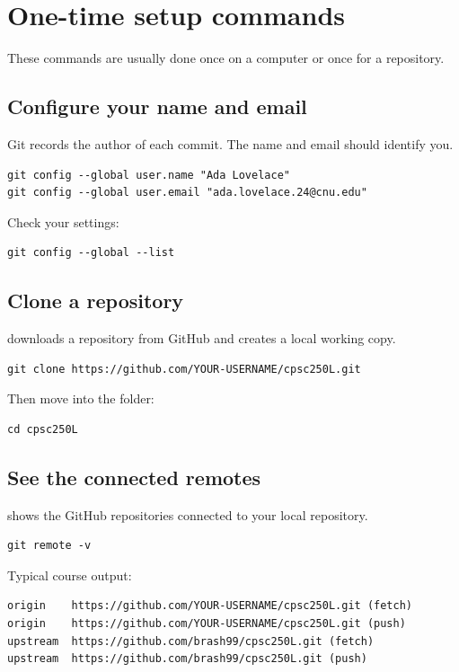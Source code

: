 \documentclass[11pt]{article}
\begin{document}
\section{One-time setup commands}

These commands are usually done once on a computer or once for a repository.

\subsection{Configure your name and email}
Git records the author of each commit.  The name and email should identify you.

\begin{lstlisting}[style=terminal]
git config --global user.name "Ada Lovelace"
git config --global user.email "ada.lovelace.24@cnu.edu"
\end{lstlisting}

Check your settings:

\begin{lstlisting}[style=terminal]
git config --global --list
\end{lstlisting}

\subsection{Clone a repository}
 downloads a repository from GitHub and creates a local working copy.

\begin{lstlisting}[style=terminal]
git clone https://github.com/YOUR-USERNAME/cpsc250L.git
\end{lstlisting}

Then move into the folder:

\begin{lstlisting}[style=terminal]
cd cpsc250L
\end{lstlisting}

\subsection{See the connected remotes}
 shows the GitHub repositories connected to your local repository.

\begin{lstlisting}[style=terminal]
git remote -v
\end{lstlisting}

Typical course output:

\begin{lstlisting}[style=terminal]
origin    https://github.com/YOUR-USERNAME/cpsc250L.git (fetch)
origin    https://github.com/YOUR-USERNAME/cpsc250L.git (push)
upstream  https://github.com/brash99/cpsc250L.git (fetch)
upstream  https://github.com/brash99/cpsc250L.git (push)
\end{lstlisting}
\end{document}
